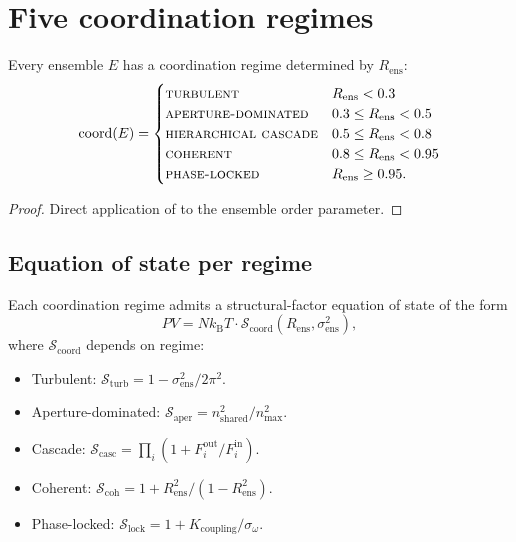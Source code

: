 \documentclass[11pt,twocolumn,a4paper]{article}
\newcommand{\kB}{k_{\mathrm{B}}}
\newcommand{\Ord}{R}
\begin{document}
\section{Five coordination regimes}
\label{sec:five-regimes}

\begin{theorem}\label{thm:ens-five}
Every ensemble $E$ has a coordination regime determined by
$\Ord_{\mathrm{ens}}$:
\[
\mathrm{coord}(E)=\begin{cases}
\textsc{turbulent} & \Ord_{\mathrm{ens}}<0.3\\
\textsc{aperture-dominated} & 0.3\le\Ord_{\mathrm{ens}}<0.5\\
\textsc{hierarchical cascade} & 0.5\le\Ord_{\mathrm{ens}}<0.8\\
\textsc{coherent} & 0.8\le\Ord_{\mathrm{ens}}<0.95\\
\textsc{phase-locked} & \Ord_{\mathrm{ens}}\ge 0.95.
\end{cases}
\]
\end{theorem}

\begin{proof}
Direct application of  to the ensemble order
parameter.
\end{proof}

\subsection{Equation of state per regime}

\begin{theorem}\label{thm:eos}
Each coordination regime admits a structural-factor equation of state
of the form
\[
PV=N\kB T\cdot\mathcal{S}_{\mathrm{coord}}(\Ord_{\mathrm{ens}},\sigma^2_{\mathrm{ens}}),
\]
where $\mathcal{S}_{\mathrm{coord}}$ depends on regime:
\begin{itemize}[leftmargin=*]
\item Turbulent: $\mathcal{S}_{\mathrm{turb}}=1-\sigma^2_{\mathrm{ens}}/2\pi^2$.
\item Aperture-dominated: $\mathcal{S}_{\mathrm{aper}}=n_{\mathrm{shared}}^2/n_{\max}^2$.
\item Cascade: $\mathcal{S}_{\mathrm{casc}}=\prod_i(1+F^{\mathrm{out}}_i/F^{\mathrm{in}}_i)$.
\item Coherent: $\mathcal{S}_{\mathrm{coh}}=1+\Ord_{\mathrm{ens}}^2/(1-\Ord_{\mathrm{ens}}^2)$.
\item Phase-locked: $\mathcal{S}_{\mathrm{lock}}=1+K_{\mathrm{coupling}}/\sigma_\omega$.
\end{itemize}
\end{theorem}
\end{document}
